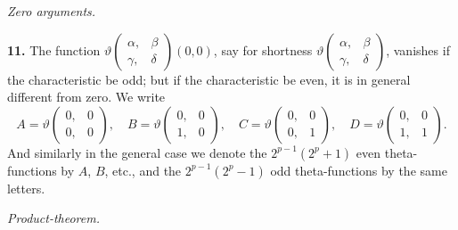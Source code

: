 \documentclass[12pt,a4paper]{article}
\theoremstyle{definition}
\begin{document}
\vspace{1em}

\begin{center}
\textit{Zero arguments.}
\end{center}

\vspace{0.5em}

\noindent\textbf{11.}\quad
The function $\vartheta\begin{pmatrix} \alpha, & \beta \\ \gamma, & \delta \end{pmatrix}(0, 0)$, say for shortness $\vartheta\begin{pmatrix} \alpha, & \beta \\ \gamma, & \delta \end{pmatrix}$, vanishes if the characteristic be odd; but if the characteristic be even, it is in general different from zero. We write
\[
A = \vartheta\begin{pmatrix} 0, & 0 \\ 0, & 0 \end{pmatrix},\quad
B = \vartheta\begin{pmatrix} 0, & 0 \\ 1, & 0 \end{pmatrix},\quad
C = \vartheta\begin{pmatrix} 0, & 0 \\ 0, & 1 \end{pmatrix},\quad
D = \vartheta\begin{pmatrix} 0, & 0 \\ 1, & 1 \end{pmatrix}.
\]
And similarly in the general case we denote the $2^{p-1}(2^p + 1)$ even theta-functions by $A$, $B$, etc., and the $2^{p-1}(2^p - 1)$ odd theta-functions by the same letters.

\vspace{1em}

\begin{center}
\textit{Product-theorem.}
\end{center}

\vspace{0.5em}
\end{document}
